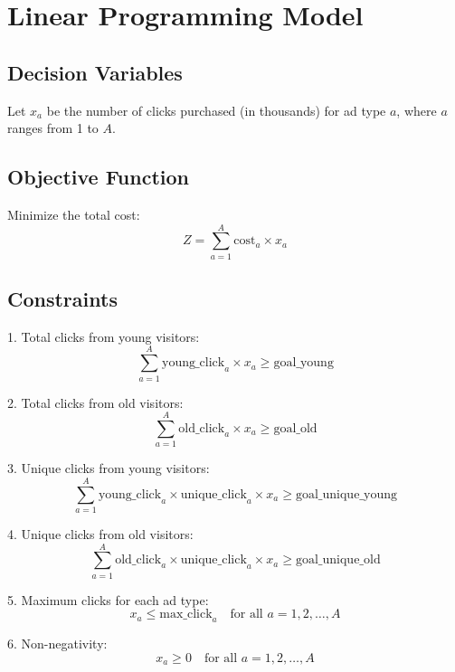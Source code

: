 \documentclass{article}
\begin{document}
\section*{Linear Programming Model}

\subsection*{Decision Variables}
Let \( x_a \) be the number of clicks purchased (in thousands) for ad type \( a \), where \( a \) ranges from 1 to \( A \).

\subsection*{Objective Function}
Minimize the total cost:
\[
Z = \sum_{a=1}^{A} \text{cost}_a \times x_a
\]

\subsection*{Constraints}
1. Total clicks from young visitors:
   \[
   \sum_{a=1}^{A} \text{young\_click}_{a} \times x_a \geq \text{goal\_young}
   \]

2. Total clicks from old visitors:
   \[
   \sum_{a=1}^{A} \text{old\_click}_{a} \times x_a \geq \text{goal\_old}
   \]

3. Unique clicks from young visitors:
   \[
   \sum_{a=1}^{A} \text{young\_click}_{a} \times \text{unique\_click}_{a} \times x_a \geq \text{goal\_unique\_young}
   \]

4. Unique clicks from old visitors:
   \[
   \sum_{a=1}^{A} \text{old\_click}_{a} \times \text{unique\_click}_{a} \times x_a \geq \text{goal\_unique\_old}
   \]

5. Maximum clicks for each ad type:
   \[
   x_a \leq \text{max\_click}_{a} \quad \text{for all } a = 1, 2, \ldots, A
   \]

6. Non-negativity:
   \[
   x_a \geq 0 \quad \text{for all } a = 1, 2, \ldots, A
   \]
\end{document}
